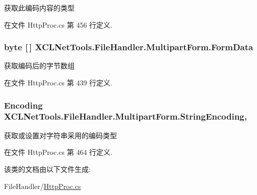 获取此编码内容的类型 



在文件 Http\-Proc.\-cs 第 456 行定义.

\hypertarget{class_x_c_l_net_tools_1_1_file_handler_1_1_multipart_form_ad540886372239dbb4fcc975e694be5d9}{
\subsubsection[{Form\-Data}]{\setlength{\rightskip}{0pt plus 5cm}byte \mbox{[}$\,$\mbox{]} X\-C\-L\-Net\-Tools.\-File\-Handler.\-Multipart\-Form.\-Form\-Data\hspace{0.3cm}{\ttfamily [get]}}}\label{class_x_c_l_net_tools_1_1_file_handler_1_1_multipart_form_ad540886372239dbb4fcc975e694be5d9}


获取编码后的字节数组 



在文件 Http\-Proc.\-cs 第 439 行定义.

\hypertarget{class_x_c_l_net_tools_1_1_file_handler_1_1_multipart_form_ade83206c0e41ad24ba543ebd89e0281f}{
\subsubsection[{String\-Encoding}]{\setlength{\rightskip}{0pt plus 5cm}Encoding X\-C\-L\-Net\-Tools.\-File\-Handler.\-Multipart\-Form.\-String\-Encoding\hspace{0.3cm}{\ttfamily [get]}, {\ttfamily [set]}}}\label{class_x_c_l_net_tools_1_1_file_handler_1_1_multipart_form_ade83206c0e41ad24ba543ebd89e0281f}


获取或设置对字符串采用的编码类型 



在文件 Http\-Proc.\-cs 第 464 行定义.



该类的文档由以下文件生成\-:\begin{DoxyCompactItemize}
\item 
File\-Handler/\hyperlink{_http_proc_8cs}{Http\-Proc.\-cs}\end{DoxyCompactItemize}
